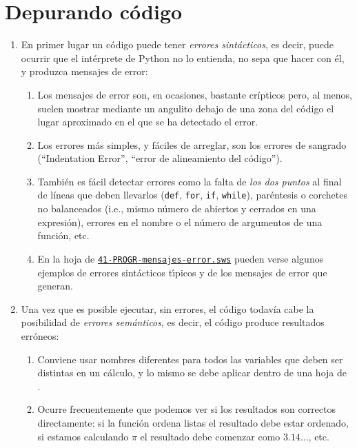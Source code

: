 \section{Depurando código}\label{depurar}

\begin{enumerate}
 \item En primer lugar un código puede tener {\itshape errores sintácticos},
es decir, puede ocurrir que el intérprete de Python no lo entienda, no sepa
que hacer con él, y produzca mensajes de error:
\begin{enumerate}
 \item  Los mensajes de error son, en ocasiones,  bastante cr\'ipticos pero, al
menos, suelen mostrar mediante un angulito  debajo de una zona del código el
lugar aproximado en el que se ha detectado el error. 
\item Los errores más simples, y fáciles de arreglar, son los errores de
sangrado (``Indentation Error'', ``error de alineamiento del código'').

\item También es fácil detectar errores como la falta de {\itshape los dos
puntos} al final de líneas que deben llevarlos (\lstinline|def|,
\lstinline|for|, 
\lstinline|if|, \lstinline|while|),
paréntesis o corchetes no balanceados (i.e., mismo número de abiertos
y cerrados en una expresión), errores en el nombre o el número de argumentos
de una función, etc.
\item En la hoja de {\sage} 
\href{http://sage.mat.uam.es:8888/home/pub/5/}{\tt 41-PROGR-mensajes-error.sws}
pueden verse algunos ejemplos de errores sint\'acticos t\'{\i}picos y de los
mensajes de error que generan. 
\end{enumerate}

\item Una vez que es posible ejecutar, sin errores,  el código todavía
cabe la posibilidad de {\itshape errores semánticos}, es decir, el código
produce resultados erróneos:

\begin{enumerate}
\item Conviene usar {\sc nombres diferentes} para todos las variables que deben
ser distintas en un cálculo, y lo mismo se debe aplicar
dentro de una hoja de {\sage}. 
 \item Ocurre frecuentemente que podemos ver si los resultados son correctos
directamente: si la función ordena listas el resultado debe estar ordenado, si
estamos calculando $\pi$ el resultado debe comenzar como $3{.}14\dots$, etc. 


\end{enumerate}
\end{enumerate}

